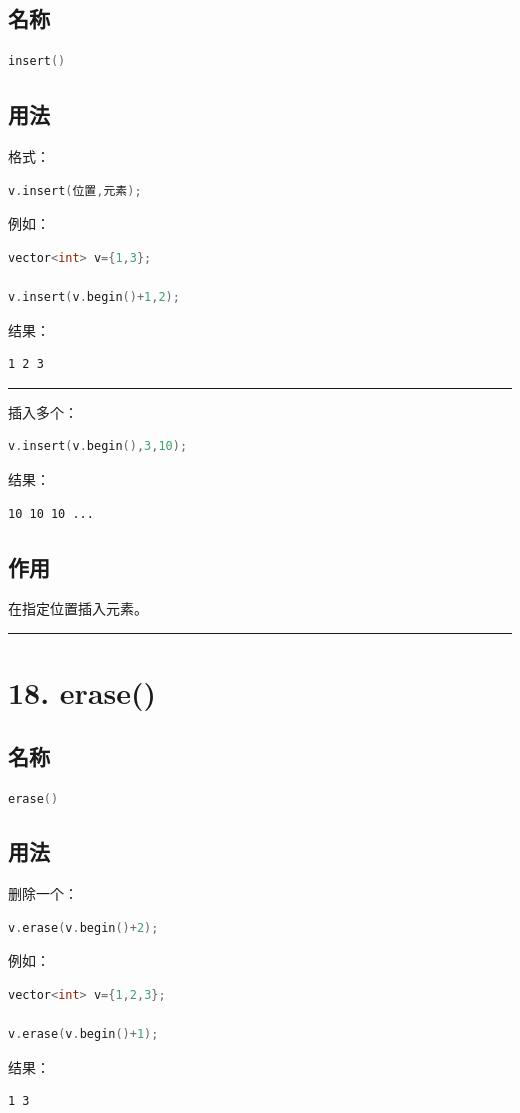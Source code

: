 \documentclass[9pt,twocolumn]{extarticle}
\begin{document}
\subsection{名称}
\begin{lstlisting}[language=C++]
insert()
\end{lstlisting}

\subsection{用法}
格式：
\begin{lstlisting}[language=C++]
v.insert(位置,元素);
\end{lstlisting}
例如：
\begin{lstlisting}[language=C++]
vector<int> v={1,3};

v.insert(v.begin()+1,2);
\end{lstlisting}
结果：
\begin{lstlisting}
1 2 3
\end{lstlisting}

\noindent\rule{\linewidth}{0.4pt}

插入多个：
\begin{lstlisting}[language=C++]
v.insert(v.begin(),3,10);
\end{lstlisting}
结果：
\begin{lstlisting}
10 10 10 ...
\end{lstlisting}

\subsection{作用}
在指定位置插入元素。

\noindent\rule{\linewidth}{0.4pt}

\section{18. erase()}

\subsection{名称}
\begin{lstlisting}[language=C++]
erase()
\end{lstlisting}

\subsection{用法}
删除一个：
\begin{lstlisting}[language=C++]
v.erase(v.begin()+2);
\end{lstlisting}
例如：
\begin{lstlisting}[language=C++]
vector<int> v={1,2,3};

v.erase(v.begin()+1);
\end{lstlisting}
结果：
\begin{lstlisting}
1 3
\end{lstlisting}
\end{document}

